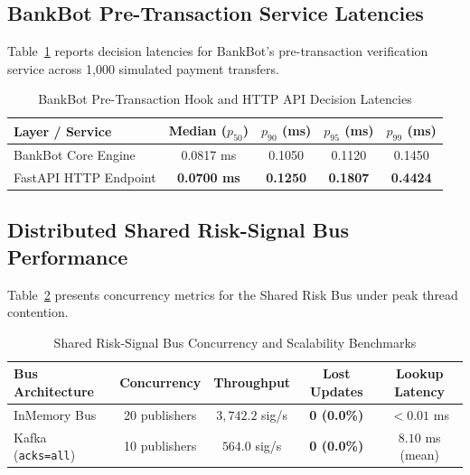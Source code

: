 \documentclass[conference]{IEEEtran}
\begin{document}
\subsection{BankBot Pre-Transaction Service Latencies}
Table~\ref{tab:api_latencies} reports decision latencies for BankBot's pre-transaction verification service across 1,000 simulated payment transfers.

\begin{table}[htbp]
\centering
\caption{BankBot Pre-Transaction Hook and HTTP API Decision Latencies}
\label{tab:api_latencies}
\small
\begin{tabular}{lcccc}
\toprule
\textbf{Layer / Service} & \textbf{Median ($p_{50}$)} & \textbf{$p_{90}$ (ms)} & \textbf{$p_{95}$ (ms)} & \textbf{$p_{99}$ (ms)} \\
\midrule
BankBot Core Engine      & 0.0817 ms                  & 0.1050                 & 0.1120                 & 0.1450 \\
FastAPI HTTP Endpoint    & \textbf{0.0700 ms}         & \textbf{0.1250}        & \textbf{0.1807}        & \textbf{0.4424} \\
\bottomrule
\end{tabular}
\end{table}

\subsection{Distributed Shared Risk-Signal Bus Performance}
Table~\ref{tab:bus_load_metrics} presents concurrency metrics for the Shared Risk Bus under peak thread contention.

\begin{table}[htbp]
\centering
\caption{Shared Risk-Signal Bus Concurrency and Scalability Benchmarks}
\label{tab:bus_load_metrics}
\small
\begin{tabular}{lcccc}
\toprule
\textbf{Bus Architecture} & \textbf{Concurrency} & \textbf{Throughput} & \textbf{Lost Updates} & \textbf{Lookup Latency} \\
\midrule
InMemory Bus              & 20 publishers        & $3,742.2$ sig/s     & \textbf{0 (0.0\%)}    & $< 0.01$ ms \\
Kafka (\texttt{acks=all}) & 10 publishers        & $564.0$ sig/s       & \textbf{0 (0.0\%)}    & $8.10$ ms (mean) \\
\bottomrule
\end{tabular}
\end{table}
\end{document}
